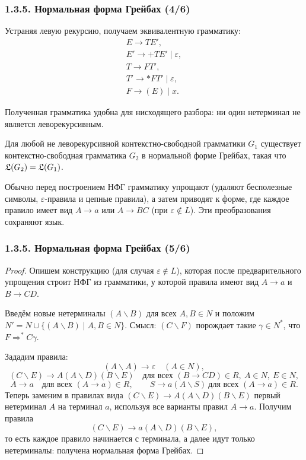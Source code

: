 \documentclass[mathserif,12pt,aspectratio=169]{beamer}
\begin{document}
\begin{frame}[shrink=22]
\frametitle{1.3.5. Нормальная форма Грейбах (4/6)}

Устраняя левую рекурсию, получаем эквивалентную грамматику:
\[
\begin{array}{l}
E\to TE' ,\\
E'\to +TE'\mid \varepsilon,\\
T\to FT',\\
T'\to \ast FT'\mid \varepsilon,\\
F\to (E)\mid x.
\end{array}
\]


\begin{remark}
Полученная грамматика удобна для нисходящего разбора:
ни один нетерминал не является леворекурсивным.
\end{remark}

\begin{theorem}
Для любой не леворекурсивной контекстно-свободной грамматики $G_1$
существует контекстно-свободная грамматика $G_2$ в нормальной форме Грейбах,
такая что  $\frak{L}(G_2)=\frak{L}(G_1)$.
\end{theorem}

\begin{digress}
Обычно перед построением НФГ грамматику упрощают (удаляют бесполезные символы,
$\varepsilon$-правила и цепные правила), а затем приводят к форме,
где каждое правило имеет вид $A\to a$ или $A\to BC$ (при $\varepsilon\notin L$).
Эти преобразования сохраняют язык.
\end{digress}

\end{frame}


\begin{frame}
\frametitle{1.3.5. Нормальная форма Грейбах (5/6)}
\begin{proof}
Опишем конструкцию (для случая $\varepsilon\notin L$), которая после предварительного упрощения
строит НФГ из грамматики, у которой правила имеют вид $A\to a$ и $B\to CD$.

Введём новые нетерминалы $(A\backslash B)$ для всех $A,B\in N$ и положим
$N' = N \cup \{(A\backslash B)\mid A,B\in N\}$.
Смысл: $(C\backslash F)$ порождает такие $\gamma\in N^*$, что $F\Rightarrow^* C\gamma$.

Зададим правила:
\[
(A\backslash A)\to \varepsilon\quad (A\in N),
\]
\[
(C\backslash E)\to A(A\backslash D)(B\backslash E)
\quad \text{для всех }(B\to CD)\in R,\ A\in N,\ E\in N,
\]
\[
A\to a \quad \text{для всех }(A\to a)\in R,
\qquad
S\to a(A\backslash S)\ \text{для всех }(A\to a)\in R.
\]
Теперь заменим в правилах вида $(C\backslash E)\to A(A\backslash D)(B\backslash E)$
первый нетерминал $A$ на терминал $a$, используя все варианты правил $A\to a$.
Получим правила
\[
(C\backslash E)\to a(A\backslash D)(B\backslash E),
\]
то есть каждое правило начинается с терминала, а далее идут только нетерминалы:
получена нормальная форма Грейбах.



\end{proof}
\end{frame}
\end{document}
